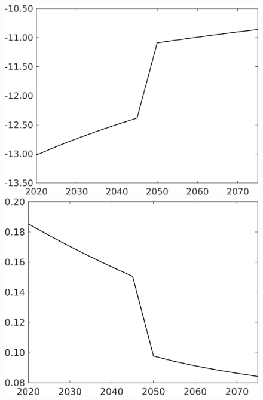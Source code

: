 \begin{figure}[h!!]
\begin{minipage}[]{0.32\textwidth}
	\end{minipage}	
	\begin{minipage}[]{0.32\textwidth}
		\includegraphics[width=1\textwidth]{../../codding_model/own_basedOnFried/optimalPol_010922_revision/figures/all_13Sept22/CompTaufPER_bytaul_Reg0_GFF_spillover0_nsk0_xgr0_knspil0_sep0_LFlimit1_emsbase0_countec0_GovRev0_etaa0.79_lgd0.png}
	\end{minipage}		
	\begin{minipage}[]{0.32\textwidth}
		\includegraphics[width=1\textwidth]{../../codding_model/own_basedOnFried/optimalPol_010922_revision/figures/all_13Sept22/CompTaufPER_bytaul_Reg0_EY_spillover0_nsk0_xgr0_knspil0_sep0_LFlimit1_emsbase0_countec0_GovRev0_etaa0.79_lgd0.png}
	\end{minipage}	
\end{figure} 

